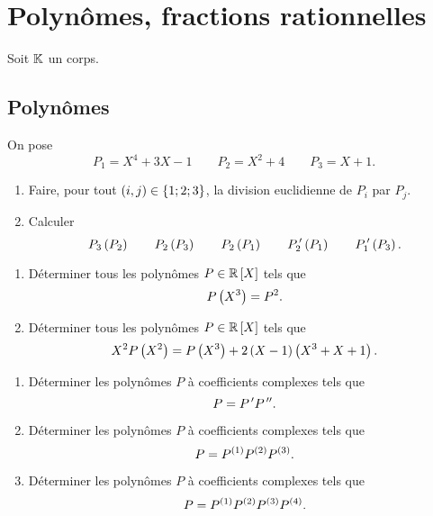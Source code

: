 \chapter{Polynômes, fractions rationnelles}

Soit \(\mathbb{K}\) un corps.

\section{Polynômes}

\begin{exo}[Exercice 1]
On pose \[P_1=X^4+3X-1\qquad P_2=X^2+4\qquad P_3=X+1.\]

\begin{enumerate}
\item Faire, pour tout \(\left(i,j\right)\in\left\lbrace1;2;3\right\rbrace\), la division euclidienne de \(P_i\) par \(P_j\). \\

\item Calculer \[P_3\left(P_2\right)\qquad P_2\left(P_3\right)\qquad P_2\left(P_1\right)\qquad P_2^{\,\prime}\left(P_1\right)\qquad P_1^{\,\prime}\left(P_3\right).\]
\end{enumerate}
\end{exo}

\begin{corr}
\end{corr}

\begin{exo}[Exercice 2]
\begin{enumerate}
\item Déterminer tous les polynômes \(P\in\poly[\R]\) tels que \[P\left(X^3\right)=P^2.\]

\item Déterminer tous les polynômes \(P\in\poly[\R]\) tels que \[X^2P\left(X^2\right)=P\left(X^3\right)+2\left(X-1\right)\left(X^3+X+1\right).\]
\end{enumerate}
\end{exo}

\begin{corr}
\end{corr}

\begin{exo}[Exercice 3]
\begin{enumerate}
\item Déterminer les polynômes \(P\) à coefficients complexes tels que \[P=P^{\,\prime} P^{\,\prime\prime}.\]

\item Déterminer les polynômes \(P\) à coefficients complexes tels que \[P=P^{\left(1\right)}P^{\left(2\right)}P^{\left(3\right)}.\]

\item Déterminer les polynômes \(P\) à coefficients complexes tels que \[P=P^{\left(1\right)}P^{\left(2\right)}P^{\left(3\right)}P^{\left(4\right)}.\]
\end{enumerate}
\end{exo}

